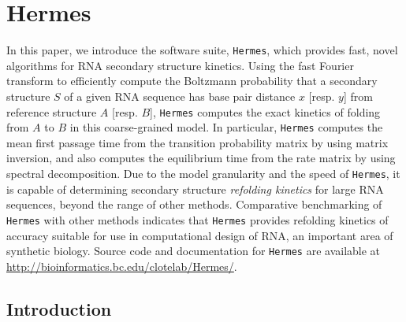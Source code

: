 
\newcommand{\mathbbP}{\mbox{\bf P}}
\newcommand{\mathbbt}{\mbox{\bf t}}
\newcommand{\hermes}{\mbox{\tt Hermes}\xspace}
\newcommand{\fftmfpt}{\mbox{\tt FFTmfpt}\xspace}
\newcommand{\ffteq}{\mbox{\tt FFTeq}\xspace}
\newcommand{\fftbor}{\mbox\fftbor\xspace}
\newcommand{\ffttwo}{\mbox{\tt FFTbor2D}\xspace}
\newcommand{\rnamfpt}{\mbox{\tt RNAmfpt}\xspace}
\newcommand{\rnaeq}{\mbox{\tt RNAeq}\xspace}
\newcommand{\rnasub}{\mbox{\tt RNAsubopt}\xspace}

\chapter{Hermes} %

\label{Hermes} %


In this paper, we introduce the software suite, {\tt Hermes}, which
provides fast, novel algorithms for RNA secondary structure kinetics.
Using the fast Fourier transform to efficiently compute the Boltzmann
probability that a secondary structure $S$ of a given RNA sequence has
base pair distance $x$ [resp. $y$] from reference structure $A$ [resp.
$B$], {\tt Hermes} computes the exact kinetics of folding from $A$ to
$B$ in this coarse-grained model. In particular, {\tt Hermes} computes
the mean first passage time from the transition probability matrix by
using matrix inversion, and also computes the equilibrium time from the
rate matrix by using spectral decomposition.
Due to the model granularity and the
speed of {\tt Hermes}, it is capable of determining secondary structure
{\em refolding kinetics} for large RNA sequences, beyond the range of
other methods.  Comparative benchmarking of {\tt Hermes} with other
methods indicates that
{\tt Hermes} provides
refolding kinetics of accuracy suitable for use in
computational design of RNA, an important area of synthetic
biology. Source code and documentation for {\tt Hermes} are available
at \url{http://bioinformatics.bc.edu/clotelab/Hermes/}.

\section{Introduction} \label{section:introduction}

